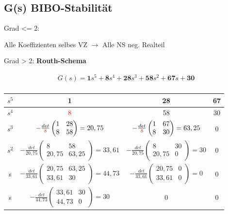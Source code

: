 \documentclass[10pt,a4paper]{article}
\begin{document}
  \subsection{G(s) BIBO-Stabilität}
  Grad <= 2:
  \begin{mdframed}[style=exercise]
      Alle Koeffizienten selbes VZ $\rightarrow$ Alle NS neg. Realteil
  \end{mdframed}
  Grad > 2:
  \textbf{Routh-Schema}
  \begin{mdframed}[style=exercise]
    \begin{align}
        G(s)=\textbf{1}s^5 + \textbf{8}s^4 + \textbf{28}s^3 + \textbf{58}s^2 + \textbf{67}s + \textbf{30}\\
    \end{align}
  \end{mdframed}
    \begin{center}
    \begin{tabular}{ |c|c|c|c| } 
     \hline
        $s^5$ & 1 & 28 & 67\\ 
     \hline
        $s^4$ & \textcolor{red}{8} & 58 & 30\\ 
     \hline
        $s^3$ & $-\frac{det}{\textcolor{red}{8}} \begin{pmatrix}
            1 & 28 \\
            8 & 58 
        \end{pmatrix} = 20,75$ 
        &  $-\frac{det}{\textcolor{red}{8}} \begin{pmatrix} 
            1 & 67 \\
            8 & 30 
        \end{pmatrix} = 63,25$ 
        & 0\\ 
     \hline
        $s^2$ & $-\frac{det}{20,75} \begin{pmatrix}
            8 & 58 \\
            20,75 & 63,25 
        \end{pmatrix} = 33,61$ 
        &  $-\frac{det}{20,75} \begin{pmatrix} 
            8 & 30 \\
            20,75 & 0 
        \end{pmatrix} = 30$ 
        & 0\\ 
     \hline
        s & $-\frac{det}{33,61} \begin{pmatrix}
            20,75 & 63,25 \\
            33,61 & 30
        \end{pmatrix} = 44,73$ 
         & $-\frac{det}{33,61} \begin{pmatrix}
            20,75 & 0 \\
            33,61 & 0 
        \end{pmatrix} = 0$ 
        & 0\\ 
     \hline
        s & $-\frac{det}{44,73} \begin{pmatrix}
            33,61 & 30\\
            44,73 & 0
        \end{pmatrix} = 30$ 
        & 0
        & 0\\ 
     \hline
    \end{tabular}
    \end{center}
\end{document}
